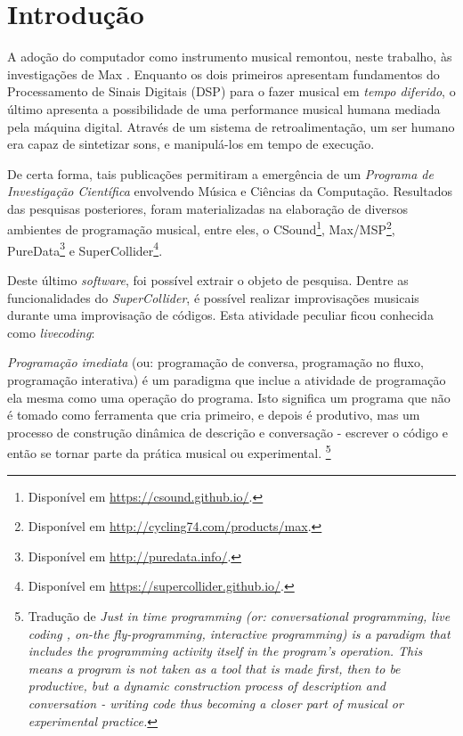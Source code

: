 \chapter*[Introdução]{Introdução}

A adoção do computador como instrumento musical remontou, neste trabalho, às investigações de Max . Enquanto os dois primeiros apresentam fundamentos do Processamento de Sinais Digitais (DSP) para o fazer musical em \emph{tempo diferido},  o último apresenta a possibilidade de uma performance musical humana mediada pela máquina digital. Através de um sistema de retroalimentação, um ser humano era capaz de sintetizar sons, e manipulá-los em tempo de execução.

De certa forma, tais publicações permitiram a emergência de um \emph{Programa de Investigação Científica} \cite{lakatos_falsification_1970,neto_lakatos_2008} envolvendo Música e Ciências da Computação. Resultados das pesquisas posteriores, foram materializadas na elaboração de diversos ambientes de programação musical, entre eles, o CSound\footnote{Disponível em \url{https://csound.github.io/}.}, Max/MSP\footnote{Disponível em \url{http://cycling74.com/products/max}.}, PureData\footnote{Disponível em \url{http://puredata.info/}.} e SuperCollider\footnote{Disponível em \url{https://supercollider.github.io/}.}.

Deste último \emph{software}, foi possível extrair o objeto de pesquisa. Dentre as funcionalidades do \emph{SuperCollider}, é possível realizar improvisações musicais durante uma improvisação de códigos. Esta atividade peculiar ficou conhecida como \emph{livecoding}:

\begin{citacao}
\emph{Programação imediata} (ou: programação de conversa, programação no fluxo, programação interativa) é um paradigma que inclue a atividade de programação ela mesma como uma operação do programa. Isto significa um programa que não é tomado como ferramenta que cria primeiro, e depois é produtivo, mas um processo de construção dinâmica de descrição e conversação - escrever o código e então se tornar parte da prática musical ou experimental. \cite[Verbete JITLib]{supercollider.org_supercollider_2014}\footnote{Tradução de \emph{Just in time programming (or: conversational programming, live coding , on-the fly-programming, interactive programming) is a paradigm that includes the programming activity itself in the program's operation. This means a program is not taken as a tool that is made first, then to be productive, but a dynamic construction process of description and conversation - writing code thus becoming a closer part of musical or experimental practice.}}
\end{citacao}

